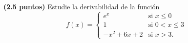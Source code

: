 
\textbf{(2.5 puntos)} Estudie la derivabilidad de la función
\[
f(x)=\begin{cases}
e^x & \text{si }x\leq0\\[4pt]
1 & \text{si }0<x\leq3\\[4pt]
-x^2+6x+2 & \text{si }x>3.
\end{cases}
\]
